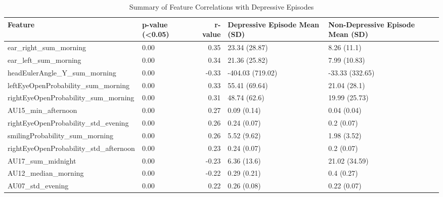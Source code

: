 \begin{table}[h]
\centering
\small
\caption{\label{tab:corr}Summary of Feature Correlations with Depressive Episodes}  %
\setlength{\tabcolsep}{4pt}  %
\begin{tabular}{lp{1cm}rp{2.5cm}p{3.1cm}}
\toprule
Feature & p-value (<0.05) & r-value & Depressive Episode Mean (SD) & Non-Depressive Episode Mean (SD) \\
\midrule
                 ear\_right\_sum\_morning &                   0.00 &     0.35 &                23.34 (28.87) &                      8.26 (11.1) \\
                  ear\_left\_sum\_morning &                   0.00 &     0.34 &                21.36 (25.82) &                     7.99 (10.83) \\
          headEulerAngle\_Y\_sum\_morning &                   0.00 &    -0.33 &             -404.03 (719.02) &                  -33.33 (332.65) \\
    leftEyeOpenProbability\_sum\_morning &                   0.00 &     0.33 &                55.41 (69.64) &                     21.04 (28.1) \\
   rightEyeOpenProbability\_sum\_morning &                   0.00 &     0.31 &                 48.74 (62.6) &                    19.99 (25.73) \\
                    AU15\_min\_afternoon &                   0.00 &     0.27 &                  0.09 (0.14) &                      0.04 (0.04) \\
   rightEyeOpenProbability\_std\_evening &                   0.00 &     0.26 &                  0.24 (0.07) &                       0.2 (0.07) \\
        smilingProbability\_sum\_morning &                   0.00 &     0.26 &                  5.52 (9.62) &                      1.98 (3.52) \\
 rightEyeOpenProbability\_std\_afternoon &                   0.00 &     0.23 &                  0.24 (0.07) &                       0.2 (0.07) \\
                     AU17\_sum\_midnight &                   0.00 &    -0.23 &                  6.36 (13.6) &                    21.02 (34.59) \\
                   AU12\_median\_morning &                   0.00 &    -0.22 &                  0.29 (0.21) &                       0.4 (0.27) \\
                      AU07\_std\_evening &                   0.00 &     0.22 &                  0.26 (0.08) &                      0.22 (0.07) \\

\end{tabular}
\end{table}

